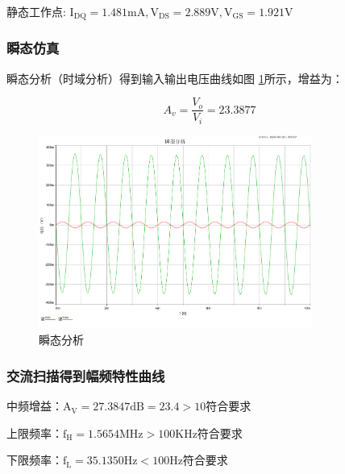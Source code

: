 \documentclass[a4paper]{article}
\theoremstyle{definition}
\theoremstyle{plain}
\theoremstyle{remark}
\newcommand{\reffig}[1]{图 \ref{#1}}
\begin{document}
静态工作点: $\mathrm{I_{DQ} = 1.481mA, V_{DS}=2.889V, V_{GS}=1.921V}$

\subsubsection{瞬态仿真}
瞬态分析（时域分析）得到输入输出电压曲线如\reffig{瞬态分析}所示，增益为：

$$
	A_v = \frac{V_o}{V_i} = 23.3877
$$
\begin{figure}[H]
	\centering
	\includegraphics[width=0.8\textwidth]{瞬态分析}
	\caption{瞬态分析}
	\label{瞬态分析}
\end{figure}

\subsubsection{交流扫描得到幅频特性曲线}
中频增益：$\mathrm{A_V=27.3847dB = 23.4>10}$符合要求

上限频率：$\mathrm{f_H=1.5654MHz>100KHz}$符合要求

下限频率：$\mathrm{f_L=35.1350Hz<100Hz}$符合要求
\end{document}
